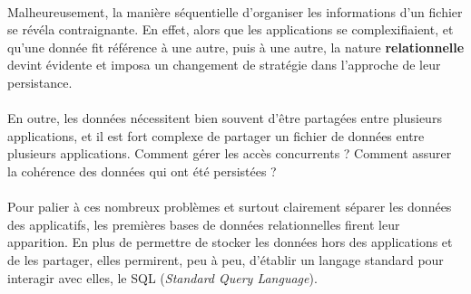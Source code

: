 {  \paragraph{} Malheureusement, la manière séquentielle d'organiser les informations d'un fichier
  se révéla contraignante. En effet, alors que les applications se complexifiaient, et qu'une donnée
  fit référence à une autre, puis à une autre, la nature \textbf{relationnelle} devint évidente et
  imposa un changement de stratégie dans l'approche de leur persistance.

  \paragraph{} En outre, les données nécessitent bien souvent d'être partagées entre plusieurs
  applications, et il est fort complexe de partager un fichier de données entre plusieurs
  applications. Comment gérer les accès concurrents ? Comment assurer la cohérence des données qui
  ont été persistées ?
  \paragraph{} Pour palier à ces nombreux problèmes et surtout clairement séparer les données des
  applicatifs, les premières bases de données relationnelles firent leur apparition. En plus de
  permettre de stocker les données hors des applications et de les partager, elles permirent, peu à
  peu, d'établir un langage standard pour interagir avec elles, le SQL (\textit{Standard Query
  Language}).
}



